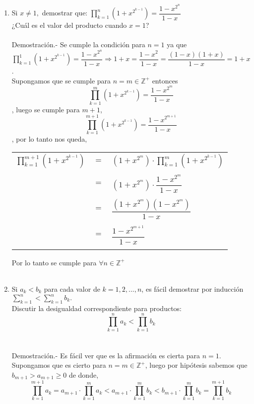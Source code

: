 \begin{enumerate}[ \bfseries 1.]
\item Si $x\neq 1,$ demostrar que: $\displaystyle\prod_{k=1}^n (1 + x^{2^{k-1}}) = \dfrac{1 - x^{2^n}}{1-x}$\\
¿Cuál es el valor del producto cuando $x=1$?\\\\
Demostración.- \; Se cumple la condición para $n=1$ ya que $\prod\limits_{k=1}^1 (1 + x^{2^{k-1}}) = \dfrac{1 - x^{2^{n}}}{1-x} \Rightarrow 1 + x = \dfrac{1 - x^2}{1-x} = \dfrac{(1-x)(1+x)}{1-x} = 1+x$.\\
Supongamos que se cumple para $n= m \in \mathbb{Z}^+$ entonces $$\prod\limits_{k=1}^m (1 + x^{2^{k-1}}) = \dfrac{1 - x^{2^m}}{1-x}$$, luego se cumple para $m+1$, $$\prod\limits_{k=1}^{m+1} (1 + x^{2^{k-1}}) = \dfrac{1 - x^{2^{m+1}}}{1-x}$$, por lo tanto nos queda,\\
\begin{center}
\begin{tabular}{rcl}
$\prod\limits_{k=1}^{m+1} (1 + x^{2^{k-1}})$&$=$&$(1 + x^{2^{m}})\cdot \prod\limits_{k=1}^{m} (1 + x^{2^{k-1}})$\\\\
&$=$&$(1 + x^{2^{m}})\cdot \dfrac{1 - x^{2^m}}{1-x}$\\\\
&$=$&$\dfrac{(1+x^{2^m})(1-x^{2^m})}{1-x}$\\\\
&$=$&$\dfrac{1 - x^{2^{m+1}}}{1-x}$\\\\
\end{tabular}
\end{center}
Por lo tanto se cumple para $\forall n \in \mathbb{Z}^+$\\\\

\item Si $a_k < b_k$ para cada valor de $k=1,2,...,n$, es fácil demostrar por inducción $\displaystyle\sum_{k=1}^n < \sum_{k=1}^n b_k.$\\
Discutir la desigualdad correspondiente para productos:
$$\displaystyle\prod_{k=1}^n a_k < \prod_{k=1}^n b_k$$\\\\
Demostración.- \; Es fácil ver que es la afirmación es cierta para $n=1$. Supongamos que es cierto para $n=m \in \mathbb{Z}^+$, luego por hipótesis sabemos que $b_{m+1}>a_{m+1} \geq 0$ de donde, $$\prod\limits_{k=1}^{m+1} a_k = a_{m+1} \cdot \prod\limits_{k=1}^m a_k < a_{m+1} \cdot \prod\limits_{k=1}^m b_k<b_{m+1} \cdot \prod\limits_{k=1}^m b_k = \prod\limits_{k=1}^{m+1} b_k$$\\\\


\end{enumerate}
